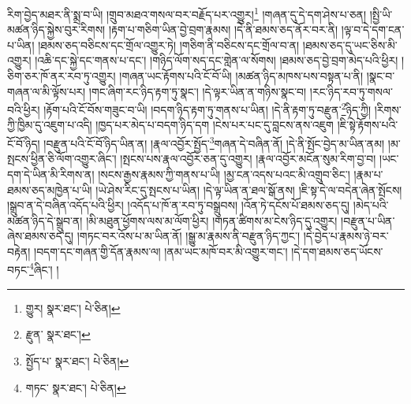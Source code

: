 རིག་བྱེད་མཐར་ནི་སྨྲ་བ་ཡི། །གྲུབ་མཐའ་གསལ་བར་བརྗོད་པར་འགྱུར།\footnote{གྱུར།  སྣར་ཐང་།  པེ་ཅིན། } །གཞན་དུ་དེ་དག་ཤེས་པ་ཅན། །སྤྱི་ཡི་མཚན་ཉིད་སྐྱེས་བུར་རིགས། །རྟག་པ་གཅིག་ཡིན་བྱེ་བྲག་རྣམས། །དེ་ནི་ཐམས་ཅད་ནོར་བར་ནི། །ལྟ་བ་དེ་དག་ངན་པ་ཡིན། །ཐམས་ཅད་བཅིངས་དང་གྲོལ་འགྱུར་ཏེ། །གཅིག་ནི་བཅིངས་དང་གྲོལ་བ་ན། །ཐམས་ཅད་དུ་ཡང་ཅིས་མི་འགྱུར། །འཆི་དང་སྐྱེ་དང་གནས་པ་དང་། །གཉིད་ལོག་སད་དང་གླེན་ལ་སོགས། །ཐམས་ཅད་བྱེ་བྲག་མེད་པའི་ཕྱིར། །ཅིག་ཅར་ཁོ་ནར་རབ་ཏུ་འགྱུར། །གཞན་ཡང་རྟོགས་པའི་ངོ་བོ་ཡི། །མཚན་ཉིད་མཁས་པས་བསྟན་པ་ནི། །སྣང་བ་གཞན་ལ་མི་ལྟོས་པར། །གང་ཞིག་རང་ཉིད་རྟག་ཏུ་སྣང་། །དེ་ལྟར་ཡིན་ན་གཉིས་སྣང་བ། །རང་ཉིད་རབ་ཏུ་གསལ་བའི་ཕྱིར། །རྟོག་པའི་ངོ་བོས་གཟུང་བ་ཡི། །བདག་ཉིད་རྟག་ཏུ་གནས་པ་ཡིན། །དེ་ནི་རྟག་ཏུ་བརྫུན་\footnote{རྫུན་  སྣར་ཐང་། }ཉིད་ཀྱི། །རིགས་ཀྱི་ཁྱིམ་དུ་འཇུག་པ་འདི། །ཁྱད་པར་མེད་པ་བདག་ཉིད་དག །ངེས་པར་པང་དུ་བླངས་ནས་འཇུག །ཇི་སྟེ་རྟོགས་པའི་ངོ་བོ་ཉིད། །བརྫུན་པའི་ངོ་བོ་ཉིད་ཡིན་ན། །རྣལ་འབྱོར་སྤྱོད་\footnote{སྤྱོད་པ་  སྣར་ཐང་།  པེ་ཅིན། }གཞན་དེ་བཞིན་ནོ། །དེ་ནི་སྤོང་བྱེད་མ་ཡིན་ནམ། །མ་སྤངས་ཕྱིན་ཅི་ལོག་འགྱུར་ཞིང་། །སྤངས་པས་རྣལ་འབྱོར་ཅན་དུ་འགྱུར། །རྣལ་འབྱོར་མངོན་སུམ་རིག་བྱ་བ། །ཡང་དག་དེ་ཡིན་མི་རིགས་ན། །སངས་རྒྱས་རྣམས་ཀྱི་གནས་པ་ཡི། །མྱ་ངན་འདས་པའང་མི་འགྲུབ་ཅིང་། །རྣམ་པ་ཐམས་ཅད་མཁྱེན་པ་ཡི། །ཡེ་ཤེས་རིང་དུ་སྤངས་པ་ཡིན། །དེ་ལྟ་ཡིན་ན་ཐལ་སྒོ་ནས། །ཇི་སྟ་དེ་ལ་བདེན་ཞེན་སྤོངས། །སྒྲུབ་ན་དེ་བཞིན་འདོད་པའི་ཕྱིར། །འདོད་པ་ཁོ་ན་རབ་ཏུ་བསྒྲུབས། །འོན་ཏེ་དངོས་པོ་ཐམས་ཅད་དུ། །མེད་པའི་མཚན་ཉིད་དེ་སྒྲུབ་ན། །མི་མཐུན་ཕྱོགས་ལས་མ་ལོག་ཕྱིར། །གཏན་ཚིགས་མ་ངེས་ཉིད་དུ་འགྱུར། །བརྫུན་པ་ཡིན་ཞེས་ཐམས་ཅད་དུ། །གཏང་བར་འོས་པ་མ་ཡིན་ནོ། །སྒྱུ་མ་རྣམས་ནི་བརྫུན་ཉིད་ཀྱང་། །དེ་བྱེད་པ་རྣམས་ཉེ་བར་བརྟེན། །བདག་དང་གཞན་གྱི་དོན་རྣམས་ལ། །ནམ་ཡང་མཁོ་བར་མི་འགྱུར་གང་། །དེ་དག་ཐམས་ཅད་ཡོངས་བཏང་\footnote{གཏང་  སྣར་ཐང་།  པེ་ཅིན། }ཞིང་། །
